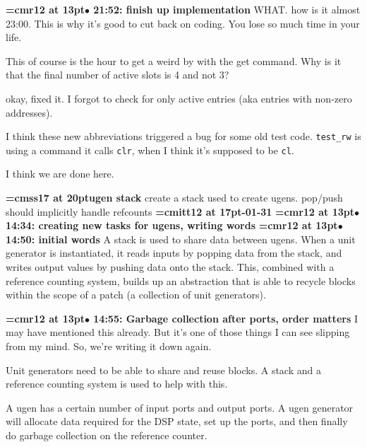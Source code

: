 {\smallskip\noindent\bf\font\titlefont=cmr12 at 13pt\titlefont $\bullet$ 21:52: finish up implementation}\smallskip
WHAT. how is it almost 23:00. This is why it's good to cut back on coding. You lose so much time in your life.
\par

This of course is the hour to get a weird by with the get command. Why is it that the final number of active slots is 4 and not 3?
\par

okay, fixed it. I forgot to check for only active entries (aka entries with non-zero addresses).
\par

I think these new abbreviations triggered a bug for some old test code. {\tt test\_rw} is using a command it calls {\tt clr}, when I think it's supposed to be {\tt cl}.
\par

I think we are done here.
\par

{\medskip\noindent\bf\font\titlefont=cmss17 at 20pt\titlefont ugen stack}\medskip
create a stack used to create ugens. pop/push
should implicitly handle refcounts
{\medskip\noindent\bf\font\titlefont=cmitt12 at 17pt-01-31}\medskip
{\smallskip\noindent\bf\font\titlefont=cmr12 at 13pt\titlefont $\bullet$ 14:34: creating new tasks for ugens, writing words}\smallskip
{\smallskip\noindent\bf\font\titlefont=cmr12 at 13pt\titlefont $\bullet$ 14:50: initial words}\smallskip
A stack is used to share data between ugens. When a unit generator is instantiated, it reads inputs by popping data from the stack, and writes output values by pushing data onto the stack. This, combined with a reference counting system, builds up an abstraction that is able to recycle blocks within the scope of a patch (a collection of unit generators).
\par

{\smallskip\noindent\bf\font\titlefont=cmr12 at 13pt\titlefont $\bullet$ 14:55: Garbage collection after ports, order matters}\smallskip
I may have mentioned this already. But it's one of those things I can see slipping from my mind. So, we're writing it down again.
\par

Unit generators need to be able to share and reuse blocks. A stack and a reference counting system is used to help with this.
\par

A ugen has a certain number of input ports and output ports. A ugen generator will allocate data required for the DSP state, set up the ports, and then finally do garbage collection on the reference counter.
\par

